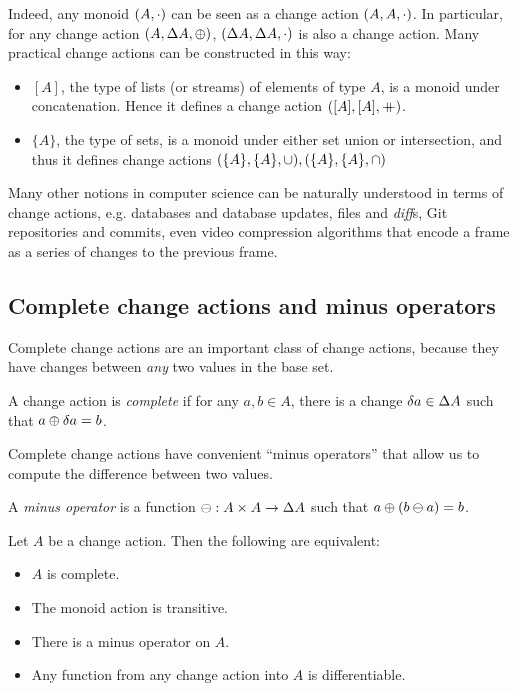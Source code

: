 Indeed, any monoid $(A, \cdot)$ can be seen as a change action $(A,A,\cdot)$. In particular,
for any change action $(A,\Delta A,\oplus)$,
$(\Delta A,\Delta A,\cdot)$ is also a change action. Many practical change actions
can be constructed in this way:
\begin{itemize}
  \item $[A]$, the type of lists (or streams) of elements of type $A$, is a monoid under
  concatenation. Hence it defines a change action $([A],[A],\mathbin{+\mkern-10mu+})$.
  \item $\{A\}$, the type of sets, is a monoid under either set union or intersection,
  and thus it defines change actions $(\{A\},\{A\},\cup),(\{A\},\{A\},\cap)$
\end{itemize}

Many other notions in computer science can be naturally understood in terms of change actions, e.g. databases
and database updates, files and \textit{diff}s, Git repositories and commits, even video compression
algorithms that encode a frame as a series of changes to the previous frame.

\subsection{Complete change actions and minus operators}

Complete change actions are an important class of change actions, because they
have changes between \emph{any} two values in the base set.

\begin{defn}
  A change action is \textit{complete} if for any $a, b \in A$, there is
  a change $\delta a \in \Delta A$ such that $a \oplus \delta a = b$.
\end{defn}

Complete change actions have convenient ``minus operators'' that allow us to
compute the difference between two values.

\begin{defn}
  A \textit{minus operator} is a function $\ominus: A \times A \rightarrow \Delta A$ such that $a \oplus (b \ominus a) = b$.
\end{defn}

\begin{prop}
  Let $A$ be a change action. Then the following are equivalent:
  \begin{itemize}
    \item $A$ is complete.
    \item The monoid action is transitive.
    \item There is a minus operator on $A$.
    \item Any function from any change action into $A$ is differentiable.
  \end{itemize}
\end{prop}


